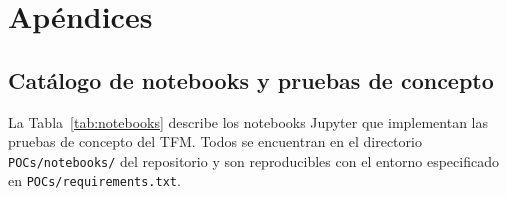 \chapter{Apéndices}
\renewcommand{\thefigure}{\thechapter.\arabic{figure}}
\renewcommand{\thetable}{\thechapter.\arabic{table}}

\section{Catálogo de notebooks y pruebas de concepto}
\label{anx:notebooks}

La Tabla~\ref{tab:notebooks} describe los notebooks Jupyter que implementan las pruebas de concepto del TFM. Todos se encuentran en el directorio \texttt{POCs/notebooks/} del repositorio y son reproducibles con el entorno especificado en \texttt{POCs/requirements.txt}.

